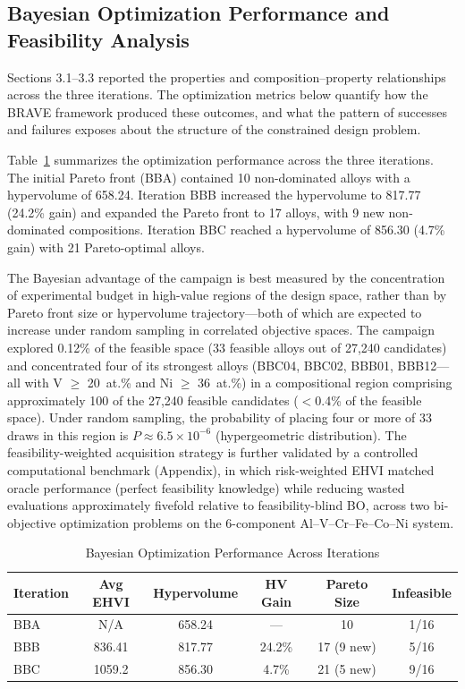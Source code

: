\subsection{Bayesian Optimization Performance and Feasibility Analysis}

Sections 3.1--3.3 reported the properties and composition--property relationships across the three iterations. The optimization metrics below quantify how the BRAVE framework produced these outcomes, and what the pattern of successes and failures exposes about the structure of the constrained design problem.

Table~\ref{tab:bo_metrics} summarizes the optimization performance across the three iterations. The initial Pareto front (BBA) contained 10 non-dominated alloys with a hypervolume of 658.24. Iteration BBB increased the hypervolume to 817.77 (24.2\% gain) and expanded the Pareto front to 17 alloys, with 9 new non-dominated compositions. Iteration BBC reached a hypervolume of 856.30 (4.7\% gain) with 21 Pareto-optimal alloys.

The Bayesian advantage of the campaign is best measured by the concentration of experimental budget in high-value regions of the design space, rather than by Pareto front size or hypervolume trajectory---both of which are expected to increase under random sampling in correlated objective spaces. The campaign explored 0.12\% of the feasible space (33 feasible alloys out of 27,240 candidates) and concentrated four of its strongest alloys (BBC04, BBC02, BBB01, BBB12---all with V $\geq$ 20~at.\% and Ni $\geq$ 36~at.\%) in a compositional region comprising approximately 100 of the 27,240 feasible candidates ($<$0.4\% of the feasible space). Under random sampling, the probability of placing four or more of 33 draws in this region is $P \approx 6.5 \times 10^{-6}$ (hypergeometric distribution). The feasibility-weighted acquisition strategy is further validated by a controlled computational benchmark (Appendix), in which risk-weighted EHVI matched oracle performance (perfect feasibility knowledge) while reducing wasted evaluations approximately fivefold relative to feasibility-blind BO, across two bi-objective optimization problems on the 6-component Al--V--Cr--Fe--Co--Ni system.

\begin{table}[t]
\centering
\caption{Bayesian Optimization Performance Across Iterations}
\label{tab:bo_metrics}
\begin{tabular}{lccccc}
\toprule
\textbf{Iteration} & \textbf{Avg EHVI} & \textbf{Hypervolume} & \textbf{HV Gain} & \textbf{Pareto Size} & \textbf{Infeasible} \\
\midrule
BBA & N/A & 658.24 & --- & 10 & 1/16 \\
BBB & 836.41 & 817.77 & 24.2\% & 17 (9 new) & 5/16 \\
BBC & 1059.2 & 856.30 & 4.7\% & 21 (5 new) & 9/16 \\
\bottomrule
\end{tabular}
\end{table}

